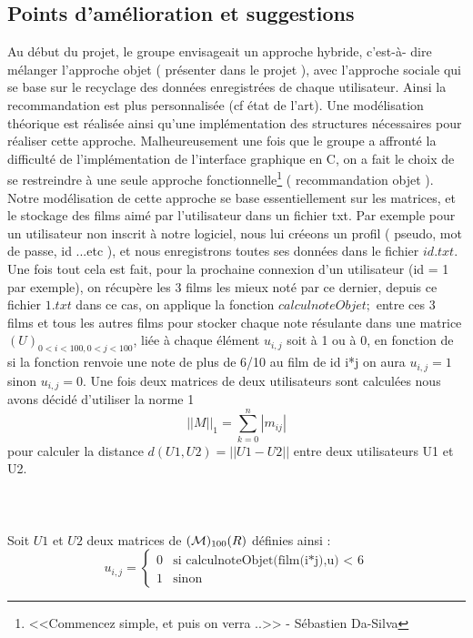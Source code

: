 \documentclass[light]{ceri}
\begin{document}
\subsection{Points d'amélioration et suggestions }

Au début du projet, le groupe envisageait un approche hybride, c'est-à- dire mélanger l'approche objet ( présenter dans le projet ), avec l'approche sociale qui se base sur le recyclage des données enregistrées de chaque utilisateur. Ainsi la recommandation est plus personnalisée (cf état de l'art). Une modélisation théorique est réalisée ainsi qu'une implémentation des structures nécessaires pour réaliser cette approche. Malheureusement une fois que le groupe a affronté la difficulté de l'implémentation de l'interface graphique en C, on a fait le choix de se restreindre à une seule approche fonctionnelle\footnote[1]{<<Commencez simple, et puis on verra ..>> - Sébastien Da-Silva} ( recommandation objet ).\\

Notre modélisation de cette approche se base essentiellement sur les matrices, et le stockage des films aimé par l'utilisateur dans un fichier txt. Par exemple pour un utilisateur non inscrit à notre logiciel, nous lui créeons un profil ( pseudo, mot de passe, id ...etc ), et nous enregistrons  toutes ses données dans le fichier \begin{math}id.txt\end{math}. Une fois tout cela est fait, pour la prochaine connexion d'un utilisateur (id = 1 par exemple), on récupère les 3 films les mieux noté par ce dernier, depuis ce fichier \begin{math}1.txt\end{math} dans ce cas, on applique la fonction \begin{math}calculnoteObjet;\end{math} entre ces 3 films et tous les autres films pour stocker chaque note résulante dans une matrice {\large$(U)_{0<i<100,0<j<100}$}, liée à chaque élément {$u_{i,j}$} soit à 1 ou à 0, en fonction de si la fonction renvoie une note de plus de 6/10 au film de id i*j on aura {$u_{i,j}=1$} sinon {$u_{i,j}=0$}. Une fois deux matrices de deux utilisateurs sont calculées nous avons décidé d'utiliser la norme 1 {\large$$||M||_1 = \sum_{k=0}^{n}|m_{ij}| $$} pour calculer la distance {\large$ d(U1,U2) = ||U1-U2||$} entre deux utilisateurs U1 et U2.\\
\\
\\
\\
 \indent Soit {$U1$} et {$U2$} deux matrices de {$({\cal M})_{100}(R)$} définies ainsi : 
$$u_{i,j}=\left\lbrace
\begin{array}{ll}
0  &  \mbox{si calculnoteObjet(film(i*j),u) < 6}\\
1 &  \mbox{sinon}
\end{array}
\right.$$ 
\end{document}
